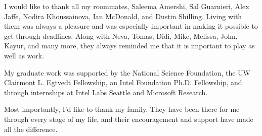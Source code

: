 {  I would like to thank all my roommates, Saleema Amershi, Sal Guarnieri, Alex Jaffe, Nodira Khoussainova, Ian McDonald, and Dustin Shilling. Living with them was always a pleasure and was especially important in making it possible to get through deadlines. Along with Neva, Tomas, Didi, Mike, Melissa, John, Kayur, and many more, they always reminded me that it is important to play as well as work.
  
  My graduate work was supported by the National Science Foundation, the UW Clairmont L. Egtvedt Fellowship, an Intel Foundation Ph.D. Fellowship, and through internships at Intel Labs Seattle and Microsoft Research.
  
  Most importantly, I'd like to thank my family. They have been there for me through every stage of my life, and their encouragement and support have made all the difference.
}